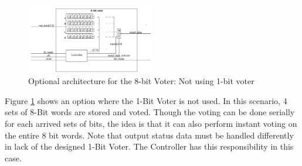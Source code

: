 \documentclass[a4paper]{IEEEtran}
\begin{document}
\begin{figure}[h!]
    \centering
    \includegraphics[width=0.5\textwidth]{Figures/Solution/ArchitectureOption3}
    \caption{Optional architecture for the 8-bit Voter: Not using 1-bit voter}
    \label{fig:ArchitectureOption3}
\end{figure}
Figure \ref{fig:ArchitectureOption3} shows an option where the 1-Bit Voter is not used. In this scenario, 4 sets of 8-Bit words are stored and voted.
Though the voting can be done serially for each arrived sets of bits, the idea is that it can also perform instant voting on the entire 8 bit words.
Note that output status data must be handled differently in lack of the designed 1-Bit Voter.
The Controller has this responsibility in this case.
\end{document}
